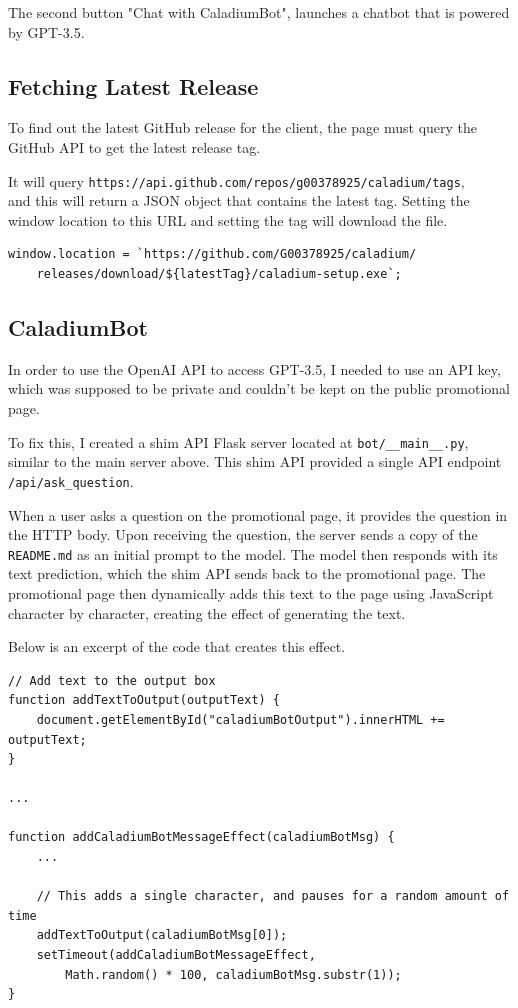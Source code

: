 The second button "Chat with CaladiumBot",
launches a chatbot that is powered by GPT-3.5.

\subsection{Fetching Latest Release}
To find out the latest GitHub release for the client,
the page must query the GitHub API to get the latest release tag.

It will query \texttt{https://api.github.com/repos/g00378925/caladium/tags}, \\
and this will return a JSON object that contains the latest tag.
Setting the window location to this URL and
setting the tag will download the file.

\begin{lstlisting}
window.location = `https://github.com/G00378925/caladium/
    releases/download/${latestTag}/caladium-setup.exe`;
\end{lstlisting}

\subsection{CaladiumBot}
In order to use the OpenAI API to access GPT-3.5,
I needed to use an API key,
which was supposed to be private and
couldn't be kept on the public promotional page.

To fix this, I created a shim API Flask server located at 
\texttt{bot/\_\_main\_\_.py}, similar to the main server above.
This shim API provided a single API endpoint \texttt{/api/ask\_question}.

When a user asks a question on the promotional page,
it provides the question in the HTTP body.
Upon receiving the question,
the server sends a copy of the \texttt{README.md} 
as an initial prompt to the model.
The model then responds with its text prediction,
which the shim API sends back to the promotional page.
The promotional page then dynamically adds
this text to the page using JavaScript character by character,
creating the effect of generating the text.

Below is an excerpt of the code that creates this effect.

\begin{lstlisting}
// Add text to the output box
function addTextToOutput(outputText) {
    document.getElementById("caladiumBotOutput").innerHTML += outputText;
}

...

function addCaladiumBotMessageEffect(caladiumBotMsg) {
    ...

    // This adds a single character, and pauses for a random amount of time
    addTextToOutput(caladiumBotMsg[0]);
    setTimeout(addCaladiumBotMessageEffect,
        Math.random() * 100, caladiumBotMsg.substr(1));
}
\end{lstlisting}
